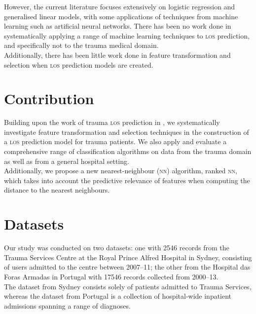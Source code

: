 \documentclass[portrait]{usydposter}
\newcommand{\acronym}[1]{\textsc{#1}\xspace}
\newcommand{\los}{\acronym{los}}
\newcommand{\nn}{\acronym{nn}}
\begin{document}
\begin{multicols}{3}
\noindent However, the current literature focuses extensively
on logistic regression and generalised linear models, with some applications
of techniques from machine learning such as artificial neural networks.
There has been no work done in systematically
applying a range of machine learning techniques to \los prediction, and
specifically not to the trauma medical domain.
\\

\noindent Additionally, there has been little work done in feature
transformation and selection when \los prediction models are created.
\\

\section{Contribution}
\noindent Building upon the work of trauma \los prediction in \cite{Dinh2013a},
we systematically investigate feature transformation and selection
techniques in the construction of a \los prediction model for trauma patients.
We also apply and evaluate a comprehensive range of
classification algorithms on data from the trauma domain as well as from a
general hospital setting.
\\

\noindent Additionally, we
propose a new nearest-neighbour (\nn) algorithm, ranked \nn, which takes
into account the
predictive relevance of features when computing the distance to the nearest
neighbours.
\\

\section{Datasets}
\noindent Our study was conducted on two datasets: one with 2546 records from
the Trauma Services Centre at the Royal Prince Alfred Hospital in Sydney,
consisting of
users admitted to the centre between 2007--11; the other from the Hospital das
Foras Armadas in Portugal with 17546 records collected from 2000--13.
\\

\noindent
The dataset from Sydney consists solely of patients admitted to Trauma
Services, whereas the dataset
from Portugal is a collection of hospital-wide inpatient admissions spanning
a range of diagnoses.
\\


\end{multicols}
\end{document}
